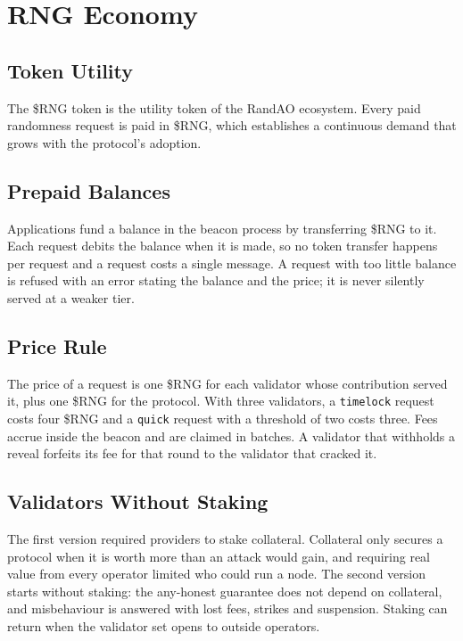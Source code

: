 \section{RNG Economy}\label{sec:rng_economics}

\subsection{Token Utility}\label{sec:token_utility}
The \$RNG token is the utility token of the RandAO ecosystem. Every paid randomness request is paid in \$RNG, which establishes a continuous demand that grows with the protocol's adoption.

\subsection{Prepaid Balances}\label{sec:balances}
Applications fund a balance in the beacon process by transferring \$RNG to it. Each request debits the balance when it is made, so no token transfer happens per request and a request costs a single message. A request with too little balance is refused with an error stating the balance and the price; it is never silently served at a weaker tier.

\subsection{Price Rule}\label{sec:price_rule}
The price of a request is one \$RNG for each validator whose contribution served it, plus one \$RNG for the protocol. With three validators, a \texttt{timelock} request costs four \$RNG and a \texttt{quick} request with a threshold of two costs three. Fees accrue inside the beacon and are claimed in batches. A validator that withholds a reveal forfeits its fee for that round to the validator that cracked it.

\subsection{Validators Without Staking}\label{sec:no_staking}
The first version required providers to stake collateral. Collateral only secures a protocol when it is worth more than an attack would gain, and requiring real value from every operator limited who could run a node. The second version starts without staking: the any-honest guarantee does not depend on collateral, and misbehaviour is answered with lost fees, strikes and suspension. Staking can return when the validator set opens to outside operators.
